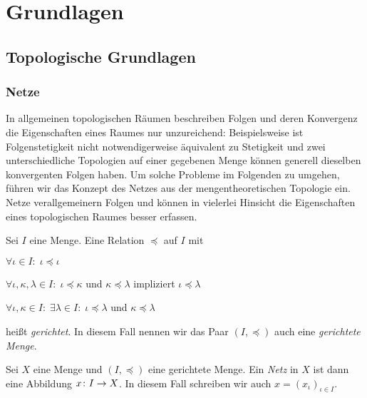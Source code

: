 \documentclass[../main/main.tex]{subfiles}
\begin{document}
	
	\section{Grundlagen}
	
	\subsection{Topologische Grundlagen}
	
	\subsubsection*{Netze}
	
	In allgemeinen topologischen Räumen beschreiben Folgen und deren Konvergenz die Eigenschaften eines Raumes nur unzureichend:
	Beispielsweise ist Folgenstetigkeit nicht notwendigerweise äquivalent zu Stetigkeit und zwei unterschiedliche Topologien auf einer 
	gegebenen Menge können generell dieselben konvergenten Folgen haben. Um solche Probleme im Folgenden zu umgehen, führen wir das
	Konzept des Netzes aus der mengentheoretischen Topologie ein. Netze verallgemeinern Folgen und können in vielerlei Hinsicht die 
	Eigenschaften eines topologischen Raumes besser erfassen.
	
	\begin{Definition}
		\label{def:directedset}
		Sei $I$ eine Menge. Eine Relation $\preceq$ auf $I$ mit
		\begin{enumeratethm}
			\item $\forall \iota \in I: \; \iota \preceq \iota$
			\item $\forall \iota, \kappa, \lambda \in I: \; \iota \preceq \kappa$ und $\kappa \preceq \lambda$ impliziert $\iota \preceq \lambda$
			\item $\forall \iota, \kappa \in I: \; \exists \lambda \in I: \; \iota \preceq \lambda$ und $\kappa \preceq \lambda$
		\end{enumeratethm}
		heißt \emph{gerichtet}. In diesem Fall nennen wir das Paar $(I, \preceq)$ auch eine \emph{gerichtete Menge}.
	\end{Definition}
	
	\begin{Definition}[Netz]
		Sei $X$ eine Menge und $(I, \preceq)$ eine gerichtete Menge. Ein \emph{Netz} in $X$ ist dann eine Abbildung $x \colon I \to X$. In diesem
		Fall schreiben wir auch $x = (x_\iota)_{\iota \in I}$.
	\end{Definition}
	
\end{document}
